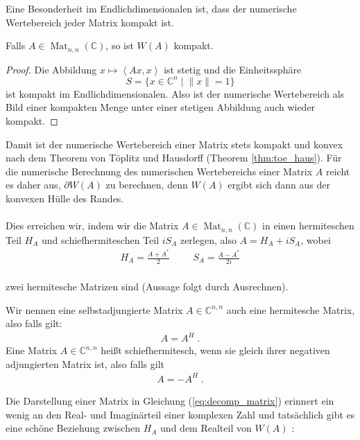 Eine Besonderheit im Endlichdimensionalen ist, dass der numerische Wertebereich jeder Matrix kompakt ist.

\begin{prop} 
	Falls $A \in \operatorname{Mat}_{n,n}(\mathbb{C})$, so ist $W(A)$ kompakt.
\end{prop}
\begin{proof}
	Die Abbildung $x \mapsto \left< Ax,x \right>$ ist stetig und die Einheitssphäre \[S=\{ x \in \mathbb{C}^n \; | \; \|x\|=1\}\] ist kompakt im Endlichdimensionalen. Also ist der numerische Wertebereich als Bild einer kompakten Menge unter einer stetigen Abbildung auch wieder kompakt.
\end{proof}

Damit ist der numerische Wertebereich einer Matrix stets kompakt und konvex nach dem Theorem von Töplitz und Hausdorff (Theorem \ref{thm:toe_haus}). Für die numerische Berechnung des numerischen Wertebereichs einer Matrix $A$ reicht es daher aus, $\partial W(A)$ zu berechnen, denn $W(A)$ ergibt sich dann aus der konvexen Hülle des Randes. \\\\

Dies erreichen wir, indem wir die Matrix $A \in \operatorname{Mat}_{n,n}(\mathbb{C})$ in einen hermiteschen Teil $H_A$ und schiefhermiteschen Teil $iS_A$ zerlegen, also $A=H_A + iS_A$, wobei \begin{align} \label{eq:decomp_matrix}
	H_A = \frac{A+A^*}{2} \hspace{1cm} S_A = \frac{A-A^*}{2i}
\end{align} \\
zwei hermitesche Matrizen sind (Aussage folgt durch Ausrechnen). 

\begin{rem}
	Wir nennen eine selbstadjungierte Matrix $A \in \mathbb{C}^{n,n}$ auch eine hermitesche Matrix, also falls gilt: 
	\begin{align*}
		A = A^H \; .
	\end{align*}
	Eine Matrix $A \in \mathbb{C}^{n,n}$ heißt schiefhermitesch, wenn sie gleich ihrer negativen adjungierten Matrix ist, also falls gilt
	\begin{align*}
		A = -A^H \; .
	\end{align*}
\end{rem}

Die Darstellung einer Matrix in Gleichung (\ref{eq:decomp_matrix}) erinnert ein wenig an den Real- und Imaginärteil einer komplexen Zahl und tatsächlich gibt es eine schöne Beziehung zwischen $H_A$ und dem Realteil von $W(A)$ \parencite[vgl. ][Theorem 1.2.5]{horn_johnson_1991}:

